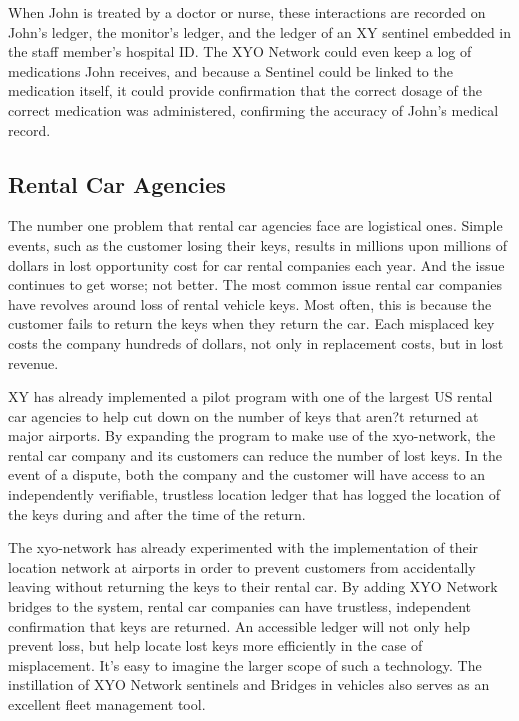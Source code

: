 \documentclass{article}
\begin{document}
When John is treated by a doctor or nurse, these interactions are recorded on John's ledger, the monitor's ledger, and the ledger of an XY \Gls{sentinel} embedded in the staff member's hospital ID. The XYO Network could even keep a log of medications John receives, and because a Sentinel could be linked to the medication itself, it could provide confirmation that the correct dosage of the correct medication was administered, confirming the accuracy of John's medical record.


\subsection{Rental Car Agencies}
The number one problem that rental car agencies face are logistical ones. Simple events, such as the customer losing their keys, results in millions upon millions of dollars in lost opportunity cost for car rental companies each year. And the issue continues to get worse; not better. The most common issue rental car companies have revolves around loss of rental vehicle keys. Most often, this is because the customer fails to return the keys when they return the car. Each misplaced key costs the company hundreds of dollars, not only in replacement costs, but in lost revenue. 

XY has already implemented a pilot program with one of the largest US rental car agencies to help cut down on the number of keys that aren?t returned at major airports. By expanding the program to make use of the \Gls{xyo-network}, the rental car company and its customers can reduce the number of lost keys. In the event of a dispute, both the company and the customer will have access to an independently verifiable, trustless location ledger that has logged the location of the keys during and after the time of the return.

The \Gls{xyo-network} has already experimented with the implementation of their location network at airports in order to prevent customers from accidentally leaving without returning the keys to their rental car. By adding XYO Network \Glspl{bridge} to the system, rental car companies can have trustless, independent confirmation that keys are returned.  An accessible ledger will not only help prevent loss, but help locate lost keys more efficiently in the case of misplacement. It's easy to imagine the larger scope of such a technology. The instillation of XYO Network \Glspl{sentinel} and Bridges in vehicles also serves as an excellent fleet management tool.
\end{document}
